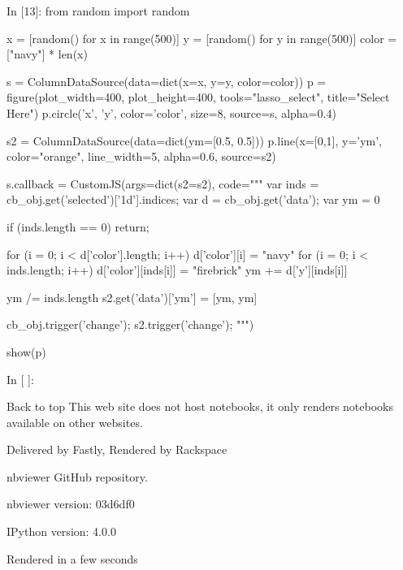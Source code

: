 In [13]:
from random import random

x = [random() for x in range(500)]
y = [random() for y in range(500)]
color = ["navy"] * len(x)

s = ColumnDataSource(data=dict(x=x, y=y, color=color))
p = figure(plot_width=400, plot_height=400, tools="lasso_select", title="Select Here")
p.circle('x', 'y', color='color', size=8, source=s, alpha=0.4)

s2 = ColumnDataSource(data=dict(ym=[0.5, 0.5]))
p.line(x=[0,1], y='ym', color="orange", line_width=5, alpha=0.6, source=s2)

s.callback = CustomJS(args=dict(s2=s2), code="""
    var inds = cb_obj.get('selected')['1d'].indices;
    var d = cb_obj.get('data');
    var ym = 0
    
    if (inds.length == 0) { return; }
    
    for (i = 0; i < d['color'].length; i++) {
        d['color'][i] = "navy"
    }
    for (i = 0; i < inds.length; i++) {
        d['color'][inds[i]] = "firebrick"
        ym += d['y'][inds[i]]
    }
    
    ym /= inds.length
    s2.get('data')['ym'] = [ym, ym]
    
    cb_obj.trigger('change');
    s2.trigger('change');
""")

show(p)
	
In [ ]:
 
Back to top
This web site does not host notebooks, it only renders notebooks available on other websites.

Delivered by Fastly, Rendered by Rackspace

nbviewer GitHub repository.

nbviewer version: 03d6df0

IPython version: 4.0.0

Rendered in a few seconds
